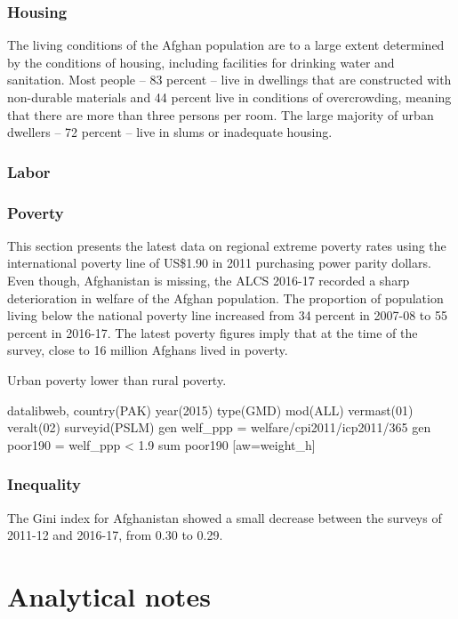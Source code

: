\documentclass[13 pt,]{book}
\begin{document}
\section{Housing}\label{housing-1}

The living conditions of the Afghan population are to a large extent
determined by the conditions of housing, including facilities for
drinking water and sanitation. Most people -- 83 percent -- live in
dwellings that are constructed with non-durable materials and 44 percent
live in conditions of overcrowding, meaning that there are more than
three persons per room. The large majority of urban dwellers -- 72
percent -- live in slums or inadequate housing.

\section{Labor}\label{labor}

\section{Poverty}\label{poverty}

This section presents the latest data on regional extreme poverty rates
using the international poverty line of US\$1.90 in 2011 purchasing
power parity dollars. Even though, Afghanistan is missing, the ALCS
2016-17 recorded a sharp deterioration in welfare of the Afghan
population. The proportion of population living below the national
poverty line increased from 34 percent in 2007-08 to 55 percent in
2016-17. The latest poverty figures imply that at the time of the
survey, close to 16 million Afghans lived in poverty.

Urban poverty lower than rural poverty.

datalibweb, country(PAK) year(2015) type(GMD) mod(ALL) vermast(01)
veralt(02) surveyid(PSLM) gen welf\_ppp = welfare/cpi2011/icp2011/365
gen poor190 = welf\_ppp \textless{} 1.9 sum poor190 {[}aw=weight\_h{]}

\section{Inequality}\label{inequality}

The Gini index for Afghanistan showed a small decrease between the
surveys of 2011-12 and 2016-17, from 0.30 to 0.29.

\part{Analytical notes}\label{part-analytical-notes}
\end{document}
